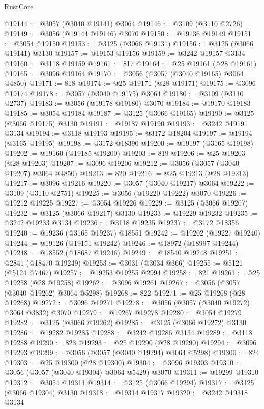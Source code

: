 \begin{lexlean}{RustCore}
\begin{coremodule}
@19144 := @3057 (@3040 @19141) @3064
@19146 := @3109 (@3110 @2726)
@19149 := @3056 (@19144 @19146) @3070
@19150 := @19136 @19149
@19151 := @3054 @19150
@19153 := @3125 (@3066 @19131)
@19156 := @3125 (@3066 @19141) @3130
@19157 := @19153 @19156
@19159 := @3242 @19157 @3134
@19160 := @3118 @19159
@19161 := 817
@19164 := @25 @19161 (@28 @19161)
@19165 := @3096 @19164
@19170 := @3056 (@3057 (@3040 @19165) @3064 @4850)
@19171 := 818
@19174 := @25 @19171 (@28 @19171)
@19175 := @3096 @19174
@19178 := @3057 (@3040 @19175) @3064
@19180 := @3109 (@3110 @2737)
@19183 := @3056 (@19178 @19180) @3070
@19184 := @19170 @19183
@19185 := @3054 @19184
@19187 := @3125 (@3066 @19165)
@19190 := @3125 (@3066 @19175) @3130
@19191 := @19187 @19190
@19193 := @3242 @19191 @3134
@19194 := @3118 @19193
@19195 := @3172 @18204
@19197 := @19194 (@3165 @19195)
@19198 := @3172 @18390
@19200 := @19197 (@3165 @19198)
@19202 := @19160 (@19185 @19200)
@19203 := 819
@19206 := @25 @19203 (@28 @19203)
@19207 := @3096 @19206
@19212 := @3056 (@3057 (@3040 @19207) @3064 @4850)
@19213 := 820
@19216 := @25 @19213 (@28 @19213)
@19217 := @3096 @19216
@19220 := @3057 (@3040 @19217) @3064
@19222 := @3109 (@3110 @2751)
@19225 := @3056 (@19220 @19222) @3070
@19226 := @19212 @19225
@19227 := @3054 @19226
@19229 := @3125 (@3066 @19207)
@19232 := @3125 (@3066 @19217) @3130
@19233 := @19229 @19232
@19235 := @3242 @19233 @3134
@19236 := @3118 @19235
@19237 := @3172 @18356
@19240 := @19236 (@3165 @19237) @18551
@19242 := @19202 (@19227 @19240)
@19244 := @19126 (@19151 @19242)
@19246 := @18972 (@18997 @19244)
@19248 := @18552 (@18687 @19246)
@19249 := @18540 @19248
@19251 := @2841 (@18470 @19249)
@19253 := @3031 (@3034 @366)
@19255 := @5121 (@5124 @7467)
@19257 := @19253 @19255 @2994
@19258 := 821
@19261 := @25 @19258 (@28 @19258)
@19262 := @3096 @19261
@19267 := @3056 (@3057 (@3040 @19262) @3064 @5298)
@19268 := 822
@19271 := @25 @19268 (@28 @19268)
@19272 := @3096 @19271
@19278 := @3056 (@3057 (@3040 @19272) @3064 @3832) @3070
@19279 := @19267 @19278
@19280 := @3054 @19279
@19282 := @3125 (@3066 @19262)
@19285 := @3125 (@3066 @19272) @3130
@19286 := @19282 @19285
@19288 := @3242 @19286 @3134
@19289 := @3118 @19288
@19290 := 823
@19293 := @25 @19290 (@28 @19290)
@19294 := @3096 @19293
@19299 := @3056 (@3057 (@3040 @19294) @3064 @5298)
@19300 := 824
@19303 := @25 @19300 (@28 @19300)
@19304 := @3096 @19303
@19310 := @3056 (@3057 (@3040 @19304) @3064 @5429) @3070
@19311 := @19299 @19310
@19312 := @3054 @19311
@19314 := @3125 (@3066 @19294)
@19317 := @3125 (@3066 @19304) @3130
@19318 := @19314 @19317
@19320 := @3242 @19318 @3134

\end{coremodule}
\end{lexlean}
